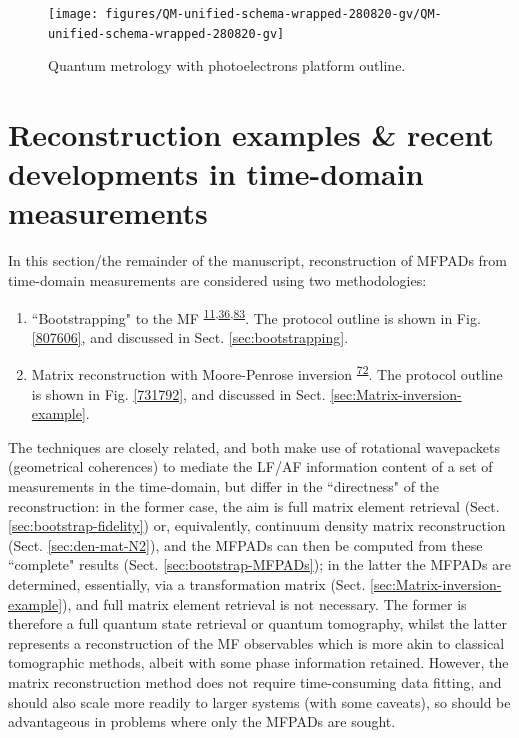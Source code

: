 \documentclass[10pt]{article}
\begin{document}
\begin{figure}[H]
\begin{center}
\texttt{[image: figures/QM-unified-schema-wrapped-280820-gv/QM-unified-schema-wrapped-280820-gv]}
\caption{{Quantum metrology with photoelectrons platform outline.
{\label{239231}}%
}}
\end{center}
\end{figure}

\section{Reconstruction examples \& recent developments in time-domain measurements\label{sec:Recon}}

In this section/the remainder of the manuscript, reconstruction of MFPADs from time-domain measurements are considered using two methodologies:

\begin{enumerate}
\item ``Bootstrapping" to the MF \textsuperscript{\hyperref[csl:11]{11},\hyperref[csl:36]{36},\hyperref[csl:83]{83}}. The protocol outline is shown in Fig. \ref{807606}, and discussed in Sect. \ref{sec:bootstrapping}.
\item Matrix reconstruction with Moore-Penrose inversion \textsuperscript{\hyperref[csl:72]{72}}. The protocol outline is shown in Fig. \ref{731792}, and discussed in Sect. \ref{sec:Matrix-inversion-example}.
\end{enumerate}

The techniques are closely related, and both make use of rotational wavepackets (geometrical coherences) to mediate the LF/AF information content of a set of measurements in the time-domain, but differ in the ``directness" of the reconstruction: in the former case, the aim is full matrix element retrieval (Sect. \ref{sec:bootstrap-fidelity}) or, equivalently, continuum density matrix reconstruction (Sect. \ref{sec:den-mat-N2}), and the MFPADs can then be computed from these ``complete" results (Sect. \ref{sec:bootstrap-MFPADs}); in the latter the MFPADs are determined, essentially, via a transformation matrix (Sect. \ref{sec:Matrix-inversion-example}), and full matrix element retrieval is not necessary. The former is therefore a full quantum state retrieval or quantum tomography, whilst the latter represents a reconstruction of the MF observables which is more akin to classical tomographic methods, albeit with some phase information retained. %
However, the matrix reconstruction method does not require time-consuming data fitting, and should also scale more readily to larger systems (with some caveats), so should be advantageous in problems where only the MFPADs are sought.
\end{document}
